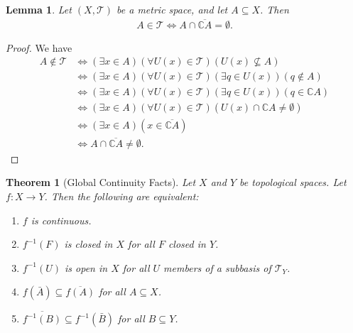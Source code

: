 \documentclass[10pt,a4paper]{article}
\theoremstyle{theorem}
\newtheorem{theorem}{Theorem}
\newtheorem{lemma}{Lemma}
\theoremstyle{definition}
\newcommand{\Tau}{\mathcal{T}}
\begin{document}
\begin{lemma}
Let $(X, \Tau)$ be a metric space, and let $A \subseteq X$. Then
\begin{align*}
A \in \Tau \iff A \cap \overline{\mathbb{C}A} = \emptyset.
\end{align*}
\end{lemma}

\begin{proof}
We have
\begin{align*}
A \not \in \Tau &\iff (\exists x \in A)(\forall U(x) \in \Tau)(U(x) \not \subseteq A)\\
&\iff (\exists x \in A)(\forall U(x) \in \Tau)(\exists q \in U(x))(q \not \in A)\\
&\iff (\exists x \in A)(\forall U(x) \in \Tau)(\exists q \in U(x))(q \in \mathbb{C}A)\\
&\iff (\exists x \in A)(\forall U(x) \in \Tau)(U(x) \cap \mathbb{C}A \not = \emptyset)\\
&\iff (\exists x \in A)(x \in \overline{\mathbb{C}A})\\
&\iff A \cap \overline{\mathbb{C} A} \not = \emptyset.
\end{align*}
\end{proof}

\begin{theorem}[Global Continuity Facts]
Let $X$ and $Y$ be topological spaces. Let $f:X \to Y$. Then the following are equivalent:
\begin{enumerate}
\item $f$ is continuous.
\item $f^{-1}(F)$ is closed in $X$ for all $F$ closed in $Y$.
\item $f^{-1}(U)$ is open in $X$ for all $U$ members of a subbasis of $\Tau_Y$.
\item $f(\bar{A}) \subseteq \overline{f(A)}$ for all $A \subseteq X$.
\item $\overline{f^{-1}(B)} \subseteq f^{-1}(\bar{B})$ for all $B \subseteq Y$.
\end{enumerate}
\end{theorem}
\end{document}
